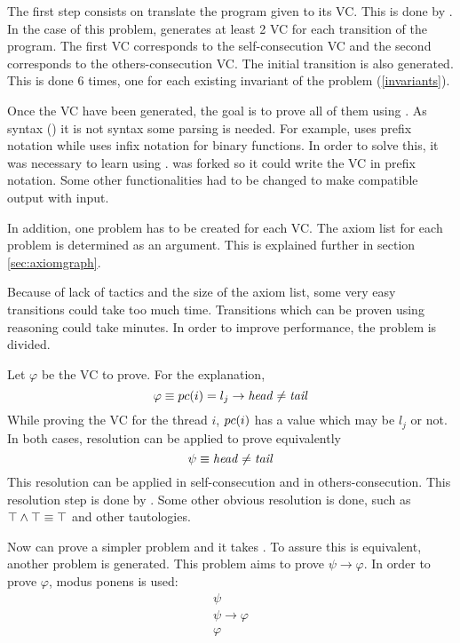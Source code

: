 The first step consists on translate the program given to its \gls{VC}. 
%
This is done by \leap. 
%
In the case of this problem, \leap generates at least 2 \gls{VC} for each transition of the program. 
%
The first \gls{VC} corresponds to the self-consecution \gls{VC} and the second corresponds to the others-consecution \gls{VC}. The initial transition is also generated.
%
This is done 6 times, one for each existing invariant of the problem (\ref{invariants}).

Once the \gls{VC} have been generated, the goal is to prove all of them using \spass. 
%
As \spass syntax (\cite{spasssyntax}) it is not \leap syntax some parsing is needed. 
%
For example, \spass uses prefix notation while \leap uses infix notation for binary functions.
%
In order to solve this, it was necessary to learn \ocaml using .
%
\leap was forked so it could write the \gls{VC} in prefix notation.
%
Some other \leap functionalities had to be changed to make compatible \leap output with \spass input.

In addition, one \spass problem has to be created for each \gls{VC}. 
%
The axiom list for each problem is determined as an argument. 
%
This is explained further in section \ref{sec:axiomgraph}.

Because of \spass lack of tactics and the size of the axiom list, some very easy transitions could take too much time.
%
Transitions which can be proven using \pc reasoning \spass could take minutes. 
%
In order to improve \spass performance, the problem is divided.

Let $\varphi$ be the \gls{VC} to prove. For the explanation, 
	\[
		\varphi \equiv pc(i) = l_j \to \mathit{head} \not = \mathit{tail}
	\]
While proving the \gls{VC} for the thread $i$, $pc(i)$ has a value which may be $l_j$ or not. 
%
In both cases, resolution can be applied to prove equivalently
	\[
		\psi \equiv \mathit{head} \not = \mathit{tail}
	\]
This resolution can be applied in self-consecution and in others-consecution. 
%
This resolution step is done by \gandalf. 
%
Some other obvious resolution is done, such as $\top \wedge \top \equiv \top$ and other tautologies.

Now \spass can prove a simpler problem and it takes .
%
To assure this is equivalent, another \spass problem is generated. 
%
This \spass problem aims to prove $\psi \to \varphi$.
%
In order to prove $\varphi$, modus ponens is used:
\[
	\begin{array}{l}
		\psi\\
		\psi \to \varphi\\\hline
		\varphi
	\end{array}
\]


